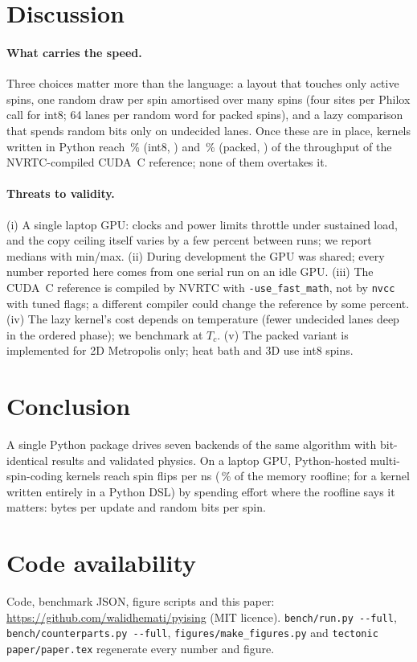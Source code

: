 \documentclass[11pt]{article}
\begin{document}
\section{Discussion}

\paragraph{What carries the speed.} Three choices matter more than the language: a layout that
touches only active spins, one random draw per spin amortised over many spins (four sites per
Philox call for int8; 64 lanes per random word for packed spins), and a lazy comparison that
spends random bits only on undecided lanes. Once these are in place, kernels written in Python reach
\dslIntPctCuda\,\% (int8, \dslIntBackend) and \dslMscPctCuda\,\% (packed, \dslMscBackend) of the
throughput of the NVRTC-compiled CUDA~C reference; none of them overtakes it.

\paragraph{Threats to validity.} (i) A single laptop GPU: clocks and power limits throttle under
sustained load, and the copy ceiling itself varies by a few percent between runs; we report
medians with min/max. (ii) During development the GPU was shared; every number reported here comes
from one serial run on an idle GPU. (iii) The CUDA~C reference is compiled by NVRTC with
\texttt{-use\_fast\_math}, not by \texttt{nvcc} with tuned flags; a different compiler could
change the reference by some percent. (iv) The lazy kernel's cost depends on temperature (fewer
undecided lanes deep in the ordered phase); we benchmark at $T_c$. (v) The packed variant is
implemented for 2D Metropolis only; heat bath and 3D use int8 spins.

\section{Conclusion}
A single Python package drives seven backends of the same algorithm with bit-identical results
and validated physics. On a laptop GPU, Python-hosted multi-spin-coding kernels reach
\bestFlips{} spin flips per ns (\bestPctCopy\,\% of the memory roofline; \bestPyFlips{} for a
kernel written entirely in a Python DSL) by spending effort where the roofline says it matters: bytes per update and random bits per spin.

\section*{Code availability}
Code, benchmark JSON, figure scripts and this paper: \url{https://github.com/walidhemati/pyising}
(MIT licence). \texttt{bench/run.py -{}-full}, \texttt{bench/counterparts.py -{}-full},
\texttt{figures/make\_figures.py} and \texttt{tectonic paper/paper.tex} regenerate every number
and figure.

\setlength{\bibsep}{2pt plus 1pt}


\end{document}
